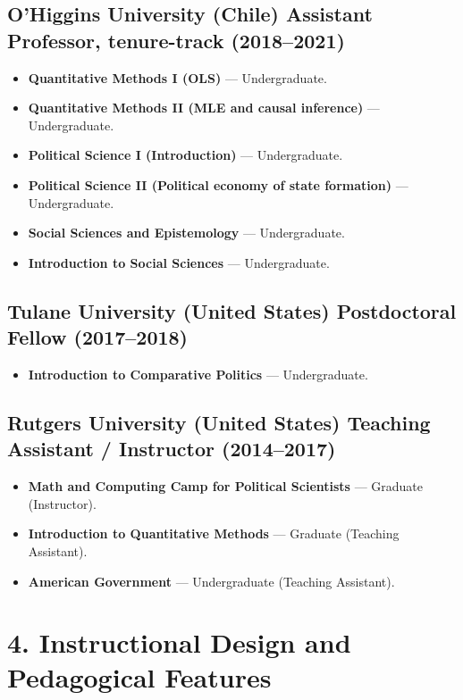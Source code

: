 \documentclass[letterpaper,11pt]{article}
\begin{document}
\subsection*{O'Higgins University (Chile) \hfill Assistant Professor, tenure-track (2018--2021)}
\begin{itemize}
  \item \textbf{Quantitative Methods I (OLS)} --- Undergraduate.
  \item \textbf{Quantitative Methods II (MLE and causal inference)} --- Undergraduate.
  \item \textbf{Political Science I (Introduction)} --- Undergraduate.
  \item \textbf{Political Science II (Political economy of state formation)} --- Undergraduate.
  \item \textbf{Social Sciences and Epistemology} --- Undergraduate.
  \item \textbf{Introduction to Social Sciences} --- Undergraduate.
\end{itemize}

\subsection*{Tulane University (United States) \hfill Postdoctoral Fellow (2017--2018)}
\begin{itemize}
  \item \textbf{Introduction to Comparative Politics} --- Undergraduate.
\end{itemize}

\subsection*{Rutgers University (United States) \hfill Teaching Assistant / Instructor (2014--2017)}
\begin{itemize}
  \item \textbf{Math and Computing Camp for Political Scientists} --- Graduate (Instructor).
  \item \textbf{Introduction to Quantitative Methods} --- Graduate (Teaching Assistant).
  \item \textbf{American Government} --- Undergraduate (Teaching Assistant).
\end{itemize}

\section*{4. Instructional Design and Pedagogical Features}
\end{document}
